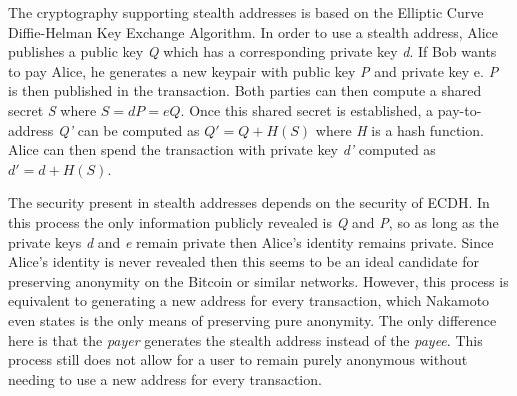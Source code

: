 \documentclass[11pt]{article}
\begin{document}
The cryptography supporting stealth addresses is based on the Elliptic Curve Diffie-Helman Key Exchange
Algorithm. In order to use a stealth address, Alice publishes a public key \emph{Q} which has a corresponding
private key \emph{d}. If Bob wants to pay Alice, he generates a new keypair with public key \emph{P} and private
key {e}. \emph{P} is then published in the transaction. Both parties can then compute a shared secret \emph{S}
where $S = dP = eQ$. Once this shared secret is established, a pay-to-address \emph{Q'} can be computed as $Q' =
Q + H(S)$ where \emph{H} is a hash function. Alice can then spend the transaction with private key \emph{d'}
computed as $d' = d + H(S)$.

The security present in stealth addresses depends on the security of ECDH. In this process the only information
publicly revealed is \emph{Q} and \emph{P}, so as long as the private keys \emph{d} and \emph{e} remain private
then Alice's identity remains private. Since Alice's identity is never revealed then this seems to be an ideal candidate
for preserving anonymity on the Bitcoin or similar networks. However, this process is equivalent to generating a new
address for every transaction, which Nakamoto even states is the only means of preserving pure
anonymity.\cite{nakamoto08} The only difference here is that the \emph{payer} generates the stealth address instead of
the \emph{payee}. This process still does not allow for a user to remain purely anonymous without needing to use a new
address for every transaction.



\end{document}

